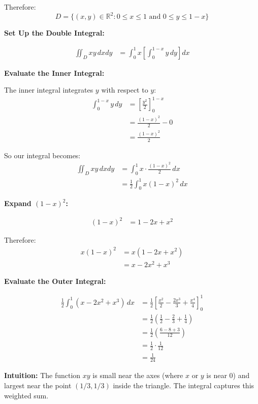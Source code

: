 Therefore:
\[
D = \{(x,y) \in \mathbb{R}^2 : 0 \leq x \leq 1 \text{ and } 0 \leq y \leq 1-x\}
\]
 
\textbf{Set Up the Double Integral:}
 
\begin{align*}
\iint_D xy \, dxdy &= \int_0^1 x \left[\int_0^{1-x} y \, dy\right] dx
\end{align*}
 
\textbf{Evaluate the Inner Integral:}
 
The inner integral integrates $y$ with respect to $y$:
\begin{align*}
\int_0^{1-x} y \, dy &= \left[\frac{y^2}{2}\right]_0^{1-x} \\
&= \frac{(1-x)^2}{2} - 0 \\
&= \frac{(1-x)^2}{2}
\end{align*}
 
So our integral becomes:
\begin{align*}
\iint_D xy \, dxdy &= \int_0^1 x \cdot \frac{(1-x)^2}{2} \, dx \\
&= \frac{1}{2}\int_0^1 x(1-x)^2 \, dx
\end{align*}
 
\textbf{Expand $(1-x)^2$:}
 
\begin{align*}
(1-x)^2 &= 1 - 2x + x^2
\end{align*}
 
Therefore:
\begin{align*}
x(1-x)^2 &= x(1 - 2x + x^2) \\
&= x - 2x^2 + x^3
\end{align*}
 
\textbf{Evaluate the Outer Integral:}
 
\begin{align*}
\frac{1}{2}\int_0^1 (x - 2x^2 + x^3) \, dx &= \frac{1}{2}\left[\frac{x^2}{2} - \frac{2x^3}{3} + \frac{x^4}{4}\right]_0^1 \\[0.5em]
&= \frac{1}{2}\left(\frac{1}{2} - \frac{2}{3} + \frac{1}{4}\right) \\[0.5em]
&= \frac{1}{2}\left(\frac{6 - 8 + 3}{12}\right) \\[0.5em]
&= \frac{1}{2} \cdot \frac{1}{12} \\[0.5em]
&= \frac{1}{24}
\end{align*}
 
 
\textbf{Intuition:} The function $xy$ is small near the axes (where $x$ or $y$ is near $0$) and largest near the point $(1/3, 1/3)$ inside the triangle. The integral captures this weighted sum.
 


